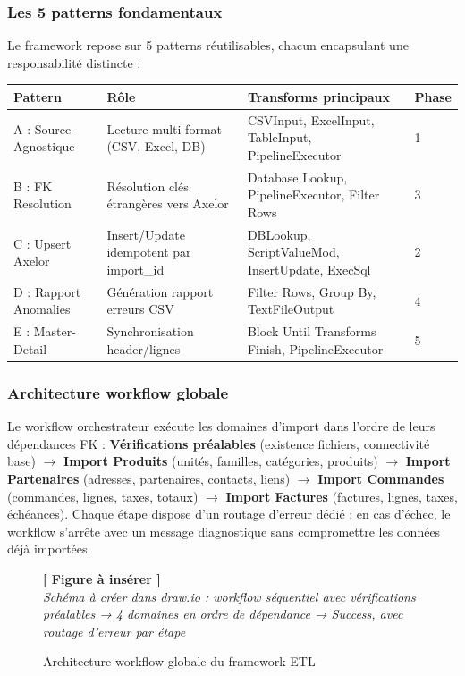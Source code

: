 \documentclass[a4paper,12pt]{article}
\newcommand{\insertfig}[3][0.80]{%
  \begin{figure}[H]
  \centering
  \colorbox{placeholderbg}{\parbox{#1\textwidth}{%
    \vspace{1.6cm}
    \centering
    {\large\color{placeholderborder}\textbf{[ Figure à insérer ]}}\\[0.5cm]
    {\small\color{gray}\textit{#2}}%
    \vspace{1.6cm}
  }}
  \caption{#3}
  \end{figure}
}
\begin{document}
\subsubsection{Les 5 patterns fondamentaux}

Le framework repose sur 5 patterns réutilisables, chacun encapsulant une responsabilité distincte :

\begin{center}
\begin{tabular}{|p{}|p{}|p{}|p{}|}
\hline
\textbf{Pattern} & \textbf{Rôle} & \textbf{Transforms principaux} & \textbf{Phase} \\
\hline
A : Source-Agnostique & Lecture multi-format (CSV, Excel, DB) & CSVInput, ExcelInput, TableInput, PipelineExecutor & 1 \\
\hline
B : FK Resolution & Résolution clés étrangères vers Axelor & Database Lookup, PipelineExecutor, Filter Rows & 3 \\
\hline
C : Upsert Axelor & Insert/Update idempotent par import\_id & DBLookup, ScriptValueMod, InsertUpdate, ExecSql & 2 \\
\hline
D : Rapport Anomalies & Génération rapport erreurs CSV & Filter Rows, Group By, TextFileOutput & 4 \\
\hline
E : Master-Detail & Synchronisation header/lignes & Block Until Transforms Finish, PipelineExecutor & 5 \\
\hline
\end{tabular}
\end{center}

\subsubsection{Architecture workflow globale}

Le workflow orchestrateur exécute les domaines d'import dans l'ordre de leurs dépendances FK : \textbf{Vérifications préalables} (existence fichiers, connectivité base) $\rightarrow$ \textbf{Import Produits} (unités, familles, catégories, produits) $\rightarrow$ \textbf{Import Partenaires} (adresses, partenaires, contacts, liens) $\rightarrow$ \textbf{Import Commandes} (commandes, lignes, taxes, totaux) $\rightarrow$ \textbf{Import Factures} (factures, lignes, taxes, échéances). Chaque étape dispose d'un routage d'erreur dédié : en cas d'échec, le workflow s'arrête avec un message diagnostique sans compromettre les données déjà importées.

\insertfig{Schéma à créer dans draw.io : workflow séquentiel avec vérifications préalables → 4 domaines en ordre de dépendance → Success, avec routage d'erreur par étape}{Architecture workflow globale du framework ETL}
\end{document}
